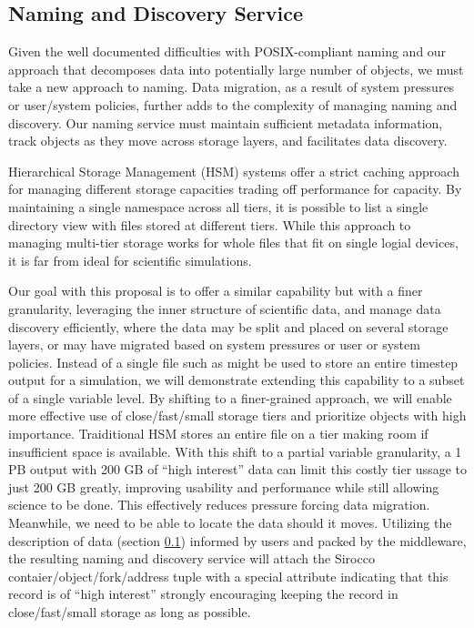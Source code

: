 \subsection{Naming and Discovery Service}

Given the well documented difficulties with POSIX-compliant naming and our
approach that decomposes data into potentially large number of objects,
we must take a new approach to naming.
Data migration, as a result of system pressures or user/system policies,
further adds to the complexity of managing naming and discovery. Our naming
service must maintain sufficient metadata information, track objects
as they move across storage layers, and facilitates data discovery.

Hierarchical Storage Management (HSM) systems \cite{hsm} offer a strict caching approach
for managing different storage capacities trading off performance for capacity.
By maintaining a single namespace across all tiers, it is possible to list a
single directory view with files stored at different tiers. While this approach
to managing multi-tier storage works for whole files that fit on single logial
devices, it is far from ideal for scientific simulations.

Our goal with this proposal is to offer a similar capability but with a finer
granularity, leveraging the inner structure of scientific data,
and manage data discovery efficiently, where the data may
be split and placed on several storage layers, or may have migrated
based on system pressures or user or system policies. Instead of a single file such as might be used to
store an entire timestep output for a simulation, we will demonstrate extending
this capability to a subset of a single variable level. By shifting to a
finer-grained approach, we will enable more effective use of close/fast/small
storage tiers and prioritize objects with high importance.
Traiditional HSM stores an entire file on a tier making room if
insufficient space is available. With this shift to a partial variable
granularity, a 1 PB output with 200 GB of ``high interest'' data can limit this
costly tier ussage to just 200 GB greatly, improving usability and performance while still
allowing science to be done. This effectively reduces
pressure forcing data migration. Meanwhile, we need to be
able to locate the data should it moves.
Utilizing the description of data (section \ref{}) informed by users and packed by the middleware,
the resulting naming and discovery service will attach the Sirocco
contaier/object/fork/address tuple with a special attribute indicating that
this record is of ``high interest'' strongly encouraging keeping the record
in close/fast/small storage as long as possible.

